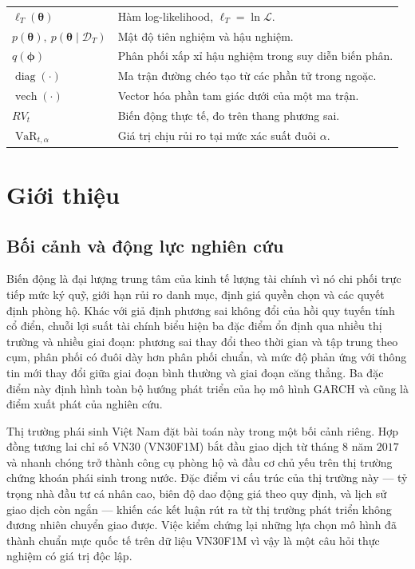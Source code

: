 \documentclass[12pt,a4paper]{article}
\numberwithin{equation}{section}
\theoremstyle{definition}
\newcommand{\diag}{\operatorname{diag}}
\newcommand{\VaR}{\operatorname{VaR}}
\newcommand{\Data}{\mathcal{D}}
\newcommand{\Param}{\symbf{\theta}}
\newcommand{\vecphi}{\symbf{\phi}}
\newcommand{\vech}{\operatorname{vech}}
\begin{document}
{\begin{longtable}{@{}p{3.0cm}>{\raggedright\arraybackslash}p{12.2cm}@{}}
$\ell_T(\Param)$ & Hàm log-likelihood, $\ell_T=\ln\mathcal{L}$. \\
$p(\Param),\ p(\Param\mid\Data_T)$ & Mật độ tiên nghiệm và hậu nghiệm. \\
$q(\vecphi)$ & Phân phối xấp xỉ hậu nghiệm trong suy diễn biến phân. \\
$\diag(\cdot)$ & Ma trận đường chéo tạo từ các phần tử trong ngoặc. \\
$\vech(\cdot)$ & Vector hóa phần tam giác dưới của một ma trận. \\
$RV_t$ & Biến động thực tế, đo trên thang phương sai. \\
$\VaR_{t,\alpha}$ & Giá trị chịu rủi ro tại mức xác suất đuôi $\alpha$. \\
\end{longtable}
}

\newpage
\section{Giới thiệu}\label{sec:intro}

\subsection{Bối cảnh và động lực nghiên cứu}\label{subsec:motivation}
Biến động là đại lượng trung tâm của kinh tế lượng tài chính vì nó chi phối trực tiếp mức
ký quỹ, giới hạn rủi ro danh mục, định giá quyền chọn và các quyết định phòng hộ. Khác
với giả định phương sai không đổi của hồi quy tuyến tính cổ điển, chuỗi lợi suất tài chính
biểu hiện ba đặc điểm ổn định qua nhiều thị trường và nhiều giai đoạn: phương sai thay
đổi theo thời gian và tập trung theo cụm, phân phối có đuôi dày hơn phân phối chuẩn, và
mức độ phản ứng với thông tin mới thay đổi giữa giai đoạn bình thường và giai đoạn căng
thẳng. Ba đặc điểm này định hình toàn bộ hướng phát triển của họ mô hình GARCH và cũng là
điểm xuất phát của nghiên cứu.

Thị trường phái sinh Việt Nam đặt bài toán này trong một bối cảnh riêng. Hợp đồng tương
lai chỉ số VN30 (VN30F1M) bắt đầu giao dịch từ tháng $8$ năm $2017$ và nhanh chóng trở
thành công cụ phòng hộ và đầu cơ chủ yếu trên thị trường chứng khoán phái sinh trong
nước. Đặc điểm vi cấu trúc của thị trường này --- tỷ trọng nhà đầu tư cá nhân cao, biên độ
dao động giá theo quy định, và lịch sử giao dịch còn ngắn --- khiến các kết luận rút ra từ
thị trường phát triển không đương nhiên chuyển giao được. Việc kiểm chứng lại những lựa
chọn mô hình đã thành chuẩn mực quốc tế trên dữ liệu VN30F1M vì vậy là một câu hỏi thực
nghiệm có giá trị độc lập.
\end{document}
